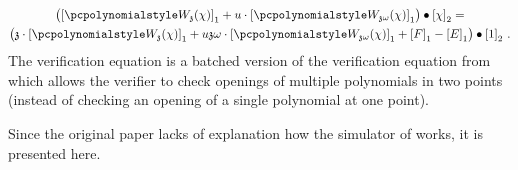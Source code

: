 \documentclass[runningheads,11pt]{llncs}
\theoremstyle{definition}
\begin{document}
\begin{description}
\begin{multline}
		\label{eq:ver_eq}
		\left(
		\gone{\p{W_{\chz}}(\chi)} + u \cdot \gone{\p{W_{\chz \omega}}(\chi)}
		\right) \bullet
		\gtwo{\chi} = \\
		\left(
			\chz \cdot \gone{\p{W_{\chz}}(\chi)} + u \chz \omega \cdot \gone{\p{W_{\chz \omega}}(\chi)} + \gone{F} - \gone{E}
		\right) \bullet
		\gtwo{1}\,.
	\end{multline}
The verification equation is a batched version of the verification equation from \cite{AC:KatZavGol10} which allows the verifier to check openings of multiple polynomials in two points (instead of checking an opening of a single polynomial at one point).
\end{description}

Since the original paper \cite{EPRINT:GabWilCio19} lacks of explanation how the simulator of \plonk{} works, it is presented here.
\end{document}
